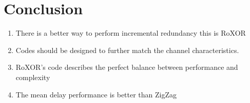\section{Conclusion}
\label{sec:conclusion}

\begin{enumerate}
    \item There is a better way to perform incremental redundancy this is RoXOR
    \item Codes should be designed to further match the channel characteristics.
    \item RoXOR's code describes the perfect balance between performance and complexity
    \item The mean delay performance is better than ZigZag
\end{enumerate}
